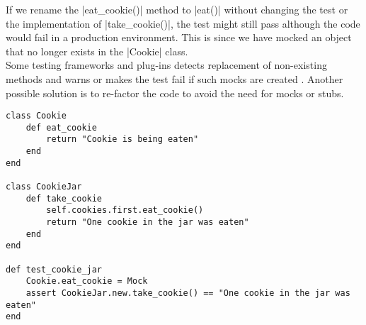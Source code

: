 If we rename the |eat_cookie()| method to |eat()| without changing the
test or the implementation of |take_cookie()|, the test might still pass
although the code would fail in a production environment. This is since
we have mocked an object that no longer exists in the |Cookie| class.\\

Some testing frameworks and plug-ins detects replacement of non-existing
methods and warns or makes the test fail if such mocks are created
\cite{video:boundaries}. Another possible solution is to re-factor the
code to avoid the need for mocks or stubs.\\

\begin{lstlisting}[caption=Example of how mocking might make tests unaware
                           of changes which breaks functionality.,
                   label=lst:mocks, float=t]
class Cookie
    def eat_cookie
        return "Cookie is being eaten"
    end
end

class CookieJar
    def take_cookie
        self.cookies.first.eat_cookie()
        return "One cookie in the jar was eaten"
    end
end

def test_cookie_jar
    Cookie.eat_cookie = Mock
    assert CookieJar.new.take_cookie() == "One cookie in the jar was eaten"
end
\end{lstlisting}
